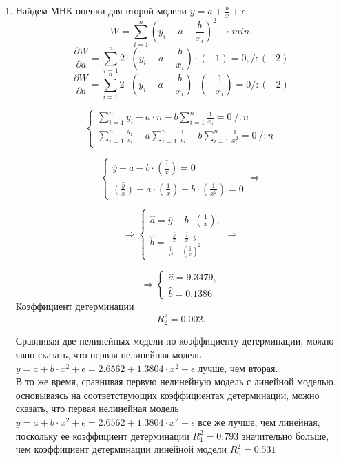 \documentclass[12pt, letterpaper, twoside]{article}
\begin{document}
\begin{enumerate}
	\item Найдем МНК-оценки для второй модели $y = a + \frac{b}{x} + \epsilon.$
	$$W = \sum_{i=1}^n(y_i- a - \frac{b}{x_i})^2 \rightarrow min.$$
	$$\frac{\partial W}{\partial a} =\sum_{i=1}^n 2 \cdot (y_i- a - \frac{b}{x_i}) \cdot (-1) = 0, /: (-2)$$
	$$\frac{\partial W}{\partial b} = \sum_{i=1}^n 2 \cdot (y_i- a - \frac{b}{x_i}) \cdot (-\frac{1}{x_i}) = 0 /: (-2)$$
	
	\begin{equation*}
		\begin{cases}
			\sum_{i=1}^n y_i - a \cdot n - b \sum_{i=1}^n \frac{1}{x_i} = 0 \ /:n \\
			\sum_{i=1}^n \frac{y_i}{x_i}- a\sum_{i=1}^n \frac{1}{x_i} - b \sum_{i=1}^n \frac{1}{x_i^2} = 0 \ /:n
		\end{cases}
	\end{equation*}

	\begin{equation*}
		\begin{cases}
			\overline{y} - a - b \cdot \overline{(\frac{1}{x})} = 0 \\
			\overline{(\frac{y}{x})} - a\cdot \overline{(\frac{1}{x})} - b \cdot \overline{(\frac{1}{x^2})} = 0
		\end{cases} \Rightarrow 
	\end{equation*}

	\begin{equation*}
		\Rightarrow 
		\begin{cases}
			\hat{a} = \overline{y} - b \cdot \overline{(\frac{1}{x})}, \\
			\hat{b} =  \frac{\overline{\frac{y}{x}} - \overline{\frac{1}{x}} \cdot \overline{y}}{\overline{\frac{1}{x^2}} -(\overline{\frac{1}{x}})^2}
		\end{cases} \Rightarrow
	\end{equation*}

	\begin{equation*}
		\Rightarrow 
		\begin{cases}
			\hat{a} =  9.3479,\\
			\hat{b} = 0.1386
		\end{cases} 
	\end{equation*}
	Коэффициент детерминации $$R_2^2 = 0.002.$$
	
	Сравнивая две нелинейных модели по коэффициенту детерминации, можно явно сказать, что первая нелинейная модель $y= a+b \cdot x^2 + \epsilon = 2.6562 + 1.3804 \cdot x^2 + \epsilon$  лучше, чем вторая.\\
	
	В то же время, сравнивая первую нелинейную модель с линейной моделью, основываясь на соответствующих коэффициентах детерминации, можно сказать, что первая нелинейная модель $y= a+b \cdot x^2 + \epsilon = 2.6562 + 1.3804 \cdot x^2 + \epsilon$ все же лучше, чем линейная, поскольку ее коэффициент детерминации $R_1^2 = 0.793$ значительно больше, чем коэффициент детерминации линейной модели $R_0^2 = 0.531$
\end{enumerate}
\end{document}
